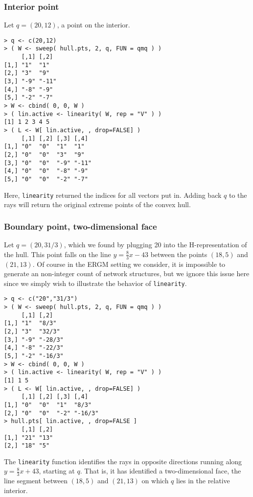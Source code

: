 \subsubsection{Interior point}
Let $q = (20,12)$, a point on the interior.
\begin{verbatim}
> q <- c(20,12)
> ( W <- sweep( hull.pts, 2, q, FUN = qmq ) )
     [,1] [,2] 
[1,] "1"  "1"  
[2,] "3"  "9"  
[3,] "-9" "-11"
[4,] "-8" "-9" 
[5,] "-2" "-7" 
> W <- cbind( 0, 0, W )
> ( lin.active <- linearity( W, rep = "V" ) )
[1] 1 2 3 4 5
> ( L <- W[ lin.active, , drop=FALSE] )
     [,1] [,2] [,3] [,4] 
[1,] "0"  "0"  "1"  "1"  
[2,] "0"  "0"  "3"  "9"  
[3,] "0"  "0"  "-9" "-11"
[4,] "0"  "0"  "-8" "-9" 
[5,] "0"  "0"  "-2" "-7" 
\end{verbatim}
Here, \texttt{linearity} returned the indices for all vectors put in.  Adding
back $q$ to the rays will return the original extreme points of the convex hull.

\subsubsection{Boundary point, two-dimensional face}
Let $q = (20,31/3)$, which we found by plugging 20 into the H-representation
of the hull.  This point falls on the line $y = \frac{8}{3}x - 43$ between
the points $(18,5)$ and $(21,13)$. Of course in the ERGM setting we consider,
it is impossible to generate an non-integer count of network structures,
but we ignore this issue here since we simply wish to illustrate the 
behavior of \texttt{linearity}.
\begin{verbatim}
> q <- c("20","31/3")
> ( W <- sweep( hull.pts, 2, q, FUN = qmq ) )
     [,1] [,2]   
[1,] "1"  "8/3"  
[2,] "3"  "32/3" 
[3,] "-9" "-28/3"
[4,] "-8" "-22/3"
[5,] "-2" "-16/3"
> W <- cbind( 0, 0, W )
> ( lin.active <- linearity( W, rep = "V" ) )
[1] 1 5
> ( L <- W[ lin.active, , drop=FALSE] )
     [,1] [,2] [,3] [,4]   
[1,] "0"  "0"  "1"  "8/3"  
[2,] "0"  "0"  "-2" "-16/3"
> hull.pts[ lin.active, , drop=FALSE ]
     [,1] [,2]
[1,] "21" "13"
[2,] "18" "5" 
\end{verbatim}
The \texttt{linearity} function identifies the rays in opposite directions
running along $y = \frac{8}{3}x + 43$, starting at $q$.  That is, it has
identified a two-dimensional face, the line segment between $(18,5)$ and $(21,13)$
on which $q$ lies in the relative interior.


